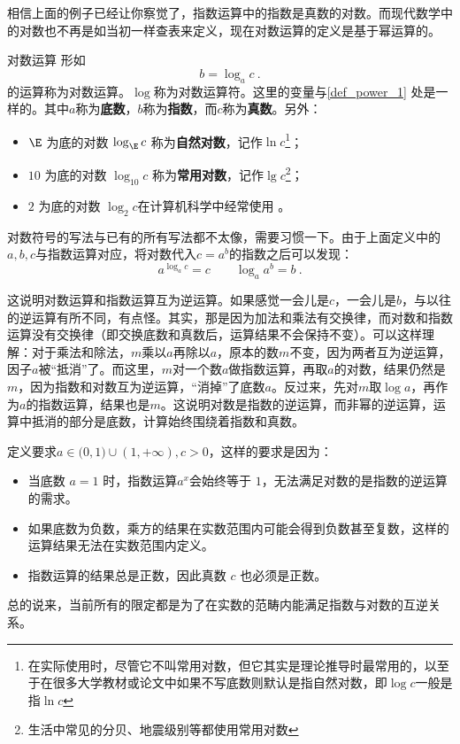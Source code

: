 相信上面的例子已经让你察觉了，指数运算中的指数是真数的对数。而现代数学中的对数也不再是如当初一样查表来定义，现在对数运算的定义是基于幂运算的。

\begin{definition}{对数运算}
形如
\begin{equation}
b=\log_ac~.
\end{equation}
的运算称为对数运算。$\log$称为对数运算符。这里的变量与\autoref{def_power_1} 处是一样的。其中$a$称为\textbf{底数}，$b$称为\textbf{指数}，而$c$称为\textbf{真数}。另外：
\begin{itemize}
\item $\E$ 为底的对数 $\log_{\E} c$ 称为\textbf{自然对数}，记作$\ln c$\footnote{在实际使用时，尽管它不叫常用对数，但它其实是理论推导时最常用的，以至于在很多大学教材或论文中如果不写底数则默认是指自然对数，即$\log c$一般是指$\ln c$}；
\item $10$ 为底的对数 $\log_{10} c$ 称为\textbf{常用对数}，记作$\lg c$\footnote{生活中常见的分贝、地震级别等都使用常用对数}；
\item $2$ 为底的对数 $\log_{2} c$在计算机科学中经常使用 。
\end{itemize}
\end{definition}

对数符号的写法与已有的所有写法都不太像，需要习惯一下。由于上面定义中的$a,b,c$与指数运算对应，将对数代入$c=a^b$的指数之后可以发现：
\begin{equation}
a^{\log_a c}=c\qquad \log_a a^b=b~.
\end{equation}

这说明对数运算和指数运算互为逆运算。如果感觉一会儿是$c$，一会儿是$b$，与以往的逆运算有所不同，有点怪。其实，那是因为加法和乘法有交换律，而对数和指数运算没有交换律（即交换底数和真数后，运算结果不会保持不变）。可以这样理解：对于乘法和除法，$m$乘以$a$再除以$a$，原本的数$m$不变，因为两者互为逆运算，因子$a$被“抵消”了。而这里，$m$对一个数$a$做指数运算，再取$a$的对数，结果仍然是$m$，因为指数和对数互为逆运算，“消掉”了底数$a$。反过来，先对$m$取$\log a$，再作为$a$的指数运算，结果也是$m$。这说明对数是指数的逆运算，而非幂的逆运算，运算中抵消的部分是底数，计算始终围绕着指数和真数。

定义要求$a\in\mathbb (0,1)\cup(1,+\infty),c>0$，这样的要求是因为：
\begin{itemize}
\item 当底数  $a = 1$  时，指数运算$a^x$会始终等于 $1$，无法满足对数的是指数的逆运算的需求。
\item 如果底数为负数，乘方的结果在实数范围内可能会得到负数甚至复数，这样的运算结果无法在实数范围内定义。
\item 指数运算的结果总是正数，因此真数  $c$  也必须是正数。
\end{itemize}
总的说来，当前所有的限定都是为了在实数的范畴内能满足指数与对数的互逆关系。

